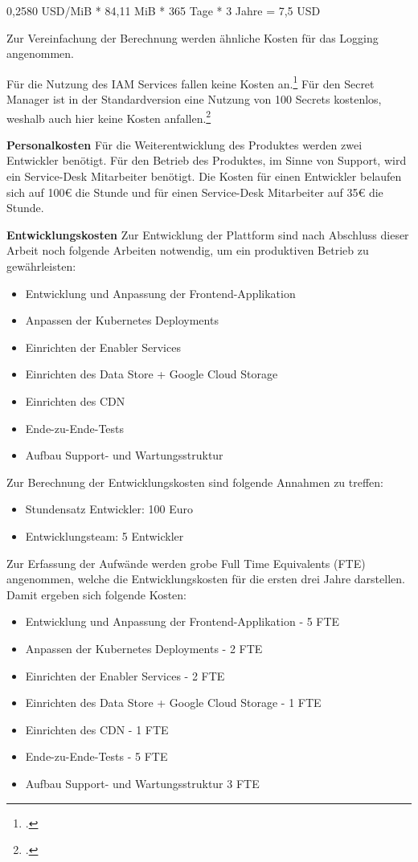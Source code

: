 0,2580 USD/MiB * 84,11 MiB * 365 Tage * 3 Jahre = 7,5 USD

Zur Vereinfachung der Berechnung werden ähnliche Kosten für das Logging angenommen.

Für die Nutzung des IAM Services fallen keine Kosten an.\footcite{GoogleIAMPricing2025}
Für den Secret Manager ist in der Standardversion eine Nutzung von 100 Secrets kostenlos, weshalb auch hier keine Kosten anfallen.\footcite{GoogleSecretManagerPricing2025}

\textbf{Personalkosten}
Für die Weiterentwicklung des Produktes werden zwei Entwickler benötigt.
Für den Betrieb des Produktes, im Sinne von Support, wird ein Service-Desk Mitarbeiter benötigt.
Die Kosten für einen Entwickler belaufen sich auf 100€ die Stunde und für einen Service-Desk Mitarbeiter auf 35€ die Stunde.


\textbf{Entwicklungskosten}
Zur Entwicklung der Plattform sind nach Abschluss dieser Arbeit noch folgende Arbeiten notwendig, um ein produktiven Betrieb zu gewährleisten:
\begin{itemize}
    \item Entwicklung und Anpassung der Frontend-Applikation
    \item Anpassen der Kubernetes Deployments
    \item Einrichten der Enabler Services
    \item Einrichten des Data Store + Google Cloud Storage
    \item Einrichten des CDN
    \item Ende-zu-Ende-Tests
    \item Aufbau Support- und Wartungsstruktur
\end{itemize}

Zur Berechnung der Entwicklungskosten sind folgende Annahmen zu treffen:
\begin{itemize}
    \item Stundensatz Entwickler: 100 Euro
    \item Entwicklungsteam: 5 Entwickler
\end{itemize}

Zur Erfassung der Aufwände werden grobe Full Time Equivalents (FTE) angenommen, welche die Entwicklungskosten für die ersten drei Jahre darstellen.
Damit ergeben sich folgende Kosten:
\begin{itemize}
    \item Entwicklung und Anpassung der Frontend-Applikation - 5 FTE
    \item Anpassen der Kubernetes Deployments - 2 FTE
    \item Einrichten der Enabler Services - 2 FTE
    \item Einrichten des Data Store + Google Cloud Storage - 1 FTE
    \item Einrichten des CDN - 1 FTE
    \item Ende-zu-Ende-Tests - 5 FTE
    \item Aufbau Support- und Wartungsstruktur 3 FTE
\end{itemize}

